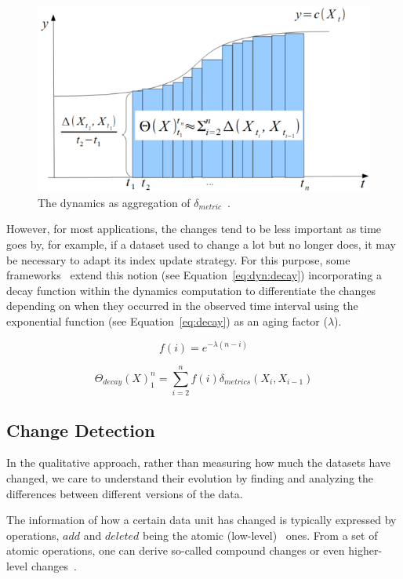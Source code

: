 \documentclass[sw]{iosart2x}
\begin{document}
\begin{figure}[h]
	\centering
	\includegraphics[scale=0.3]{img/d2.png}
	\caption{The dynamics as aggregation of $\delta_{metric}$~\cite{DividinoGSG14}.}
	\label{fig:d2}
\end{figure}

However, for most applications, the changes tend to be less important as time goes by, for example, if a dataset used to change a lot but no longer does, it may be necessary to adapt its index update strategy. For this purpose, some frameworks~\cite{DividinoGSG14, KnuthHS16} extend this notion (see Equation~\ref{eq:dyn:decay}) incorporating a decay function within the dynamics computation to differentiate the changes depending on when they occurred in the observed time interval using the exponential function (see Equation~\ref{eq:decay}) as an aging factor ($\lambda$).

\begin{equation}
\label{eq:decay}
f(i) = e^{-\lambda (n-i)}
\end{equation}

\begin{equation}
\label{eq:dyn:decay}
\Theta_{decay}(X)^{n}_{1} = \sum_{i = 2}^{n} f(i) \delta_{metrics}(X_{i}, X_{i-1})
\end{equation}

\subsection{Change Detection}

In the qualitative approach, rather than measuring how much the datasets have changed, we care to understand their evolution by finding and analyzing the differences between different versions of the data. 

The information of how a certain data unit has changed is typically expressed by operations, $add$ and $deleted$ being the atomic (low-level)~\cite{UmbrichHHPD10} ones. From a set of atomic operations, one can derive so-called compound changes or even higher-level changes~\cite{PapavasileiouFFKC13}.
\end{document}
